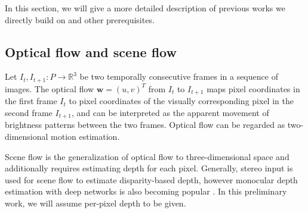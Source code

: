 In this section, we will give a more detailed description of previous works
we directly build on and other prerequisites.

\subsection{Optical flow and scene flow}
Let $I_t,I_{t+1} : P \to \mathbb{R}^3$ be two temporally consecutive frames in a
sequence of images.
The optical flow
$\mathbf{w} = (u, v)^T$ from $I_t$ to $I_{t+1}$
maps pixel coordinates in the first frame $I_t$ to pixel coordinates of the
visually corresponding pixel in the second frame $I_{t+1}$,
and can be interpreted as the apparent movement of brightness patterns between the two frames.
Optical flow can be regarded as two-dimensional motion estimation.

Scene flow is the generalization of optical flow to three-dimensional space and additionally
requires estimating depth for each pixel. Generally, stereo input is used for scene flow
to estimate disparity-based depth, however monocular depth estimation with deep networks is also becoming
popular \cite{DeeperDepth, UnsupPoseDepth}.
In this preliminary work, we will assume per-pixel depth to be given.

